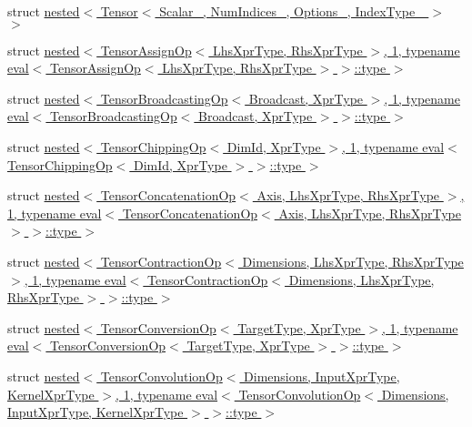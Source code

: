 \begin{DoxyCompactItemize}
\item 
struct \hyperlink{struct_eigen_1_1internal_1_1nested_3_01_tensor_3_01_scalar___00_01_num_indices___00_01_options___00_01_index_type___01_4_01_4}{nested$<$ Tensor$<$ Scalar\+\_\+, Num\+Indices\+\_\+, Options\+\_\+, Index\+Type\+\_\+ $>$ $>$}
\item 
struct \hyperlink{struct_eigen_1_1internal_1_1nested_3_01_tensor_assign_op_3_01_lhs_xpr_type_00_01_rhs_xpr_type_01d4159a152a0e6ba4b4de0b2584842bf3}{nested$<$ Tensor\+Assign\+Op$<$ Lhs\+Xpr\+Type, Rhs\+Xpr\+Type $>$, 1, typename eval$<$ Tensor\+Assign\+Op$<$ Lhs\+Xpr\+Type, Rhs\+Xpr\+Type $>$ $>$\+::type $>$}
\item 
struct \hyperlink{struct_eigen_1_1internal_1_1nested_3_01_tensor_broadcasting_op_3_01_broadcast_00_01_xpr_type_01_a47ea903448f98ead504205e509645e7}{nested$<$ Tensor\+Broadcasting\+Op$<$ Broadcast, Xpr\+Type $>$, 1, typename eval$<$ Tensor\+Broadcasting\+Op$<$ Broadcast, Xpr\+Type $>$ $>$\+::type $>$}
\item 
struct \hyperlink{struct_eigen_1_1internal_1_1nested_3_01_tensor_chipping_op_3_01_dim_id_00_01_xpr_type_01_4_00_013fc4e0c26ee0dd525012de858ae0206f}{nested$<$ Tensor\+Chipping\+Op$<$ Dim\+Id, Xpr\+Type $>$, 1, typename eval$<$ Tensor\+Chipping\+Op$<$ Dim\+Id, Xpr\+Type $>$ $>$\+::type $>$}
\item 
struct \hyperlink{struct_eigen_1_1internal_1_1nested_3_01_tensor_concatenation_op_3_01_axis_00_01_lhs_xpr_type_00_387f0c29001361c8d2e2fed7054a319e}{nested$<$ Tensor\+Concatenation\+Op$<$ Axis, Lhs\+Xpr\+Type, Rhs\+Xpr\+Type $>$, 1, typename eval$<$ Tensor\+Concatenation\+Op$<$ Axis, Lhs\+Xpr\+Type, Rhs\+Xpr\+Type $>$ $>$\+::type $>$}
\item 
struct \hyperlink{struct_eigen_1_1internal_1_1nested_3_01_tensor_contraction_op_3_01_dimensions_00_01_lhs_xpr_type916b0c22d0dc73d7838ae3849789214b}{nested$<$ Tensor\+Contraction\+Op$<$ Dimensions, Lhs\+Xpr\+Type, Rhs\+Xpr\+Type $>$, 1, typename eval$<$ Tensor\+Contraction\+Op$<$ Dimensions, Lhs\+Xpr\+Type, Rhs\+Xpr\+Type $>$ $>$\+::type $>$}
\item 
struct \hyperlink{struct_eigen_1_1internal_1_1nested_3_01_tensor_conversion_op_3_01_target_type_00_01_xpr_type_01_b83af6d243a47c048dc01ffbe6156814}{nested$<$ Tensor\+Conversion\+Op$<$ Target\+Type, Xpr\+Type $>$, 1, typename eval$<$ Tensor\+Conversion\+Op$<$ Target\+Type, Xpr\+Type $>$ $>$\+::type $>$}
\item 
struct \hyperlink{struct_eigen_1_1internal_1_1nested_3_01_tensor_convolution_op_3_01_dimensions_00_01_input_xpr_ty9d10111784dcaece5477fadf1d96c5f8}{nested$<$ Tensor\+Convolution\+Op$<$ Dimensions, Input\+Xpr\+Type, Kernel\+Xpr\+Type $>$, 1, typename eval$<$ Tensor\+Convolution\+Op$<$ Dimensions, Input\+Xpr\+Type, Kernel\+Xpr\+Type $>$ $>$\+::type $>$}

\end{DoxyCompactItemize}
